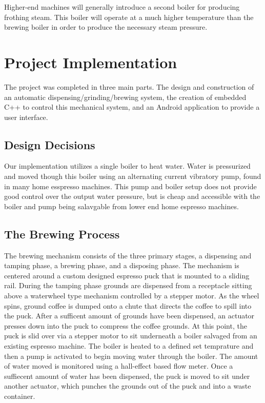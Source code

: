 \documentclass[conference]{IEEEtran}
\begin{document}
Higher-end machines will generally introduce a second boiler for producing
frothing steam. This boiler will operate at a much higher temperature than the
brewing boiler in order to produce the necessary steam pressure.


\section{Project Implementation}
The project was completed in three main parts. The design and construction of an
automatic dispensing/grinding/brewing system, the creation of embedded C++ to
control this mechanical system, and an Android application to provide a user
interface.

\subsection{Design Decisions}
Our implementation utilizes a single boiler to heat water. Water is
pressurized and moved though this boiler using an alternating current vibratory
pump, found in many home esspresso machines. This pump and boiler setup does not
provide good control over the output water pressure, but is cheap and accessible
with the boiler and pump being salavgable from lower end home espresso machines.

\subsection{The Brewing Process}
The brewing mechanism consists of the three primary stages, a dispensing and
tamping phase, a brewing phase, and a disposing phase. The mechanism is
centered around a custom designed espresso puck that is mounted to a
sliding rail. During the tamping phase grounds are dispensed from a receptacle
sitting above a waterwheel type mechanism controlled by a stepper motor. As the
wheel spins, ground coffee is dumped onto a chute that directs the coffee to
spill into the puck. After a sufficent amount of grounds have been dispensed, an
actuator presses down into the puck to compress the coffee grounds. At this
point, the puck is slid over via a stepper motor to sit underneath a boiler
salvaged from an existing espresso machine. The boiler is heated to a defined
set temprature and then a pump is activated to begin moving water through the
boiler. The amount of water moved is monitored using a hall-effect based flow
meter. Once a suffiecent amount of water has been dispensed, the puck is moved
to sit under another actuator, which punches the grounds out of the puck and
into a waste container.
\end{document}

